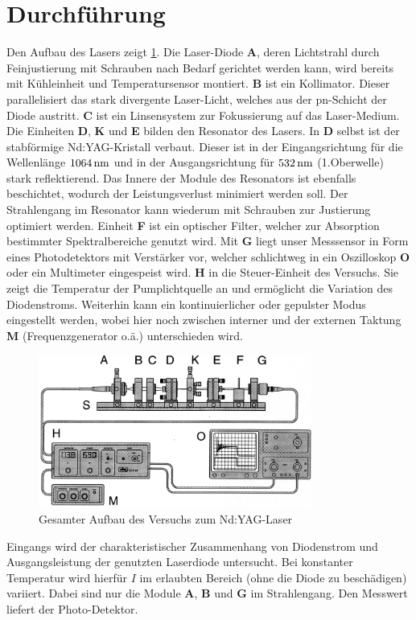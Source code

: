 \documentclass[numbers=noenddot,12pt,a4paper]{scrartcl}
\newcommand{\fett}[1]{\textbf{#1}}
\begin{document}
\section{Durchführung}\label{sec:durch}
Den Aufbau des Lasers zeigt \ref{img:aufbau}. Die Laser-Diode \fett{A}, deren Lichtstrahl durch Feinjustierung mit Schrauben nach Bedarf gerichtet werden kann, wird bereits mit Kühleinheit und Temperatursensor montiert. \fett{B} ist ein Kollimator. Dieser parallelisiert das stark divergente Laser-Licht, welches aus der pn-Schicht der Diode austritt. \fett{C} ist ein Linsensystem zur Fokussierung auf das Laser-Medium. Die Einheiten \fett{D}, \fett{K} und \fett{E} bilden den Resonator des Lasers. In \fett{D} selbst ist der stabförmige Nd:YAG-Kristall verbaut. Dieser ist in der Eingangsrichtung für die Wellenlänge $\unit[1064]{nm}$ und in der Ausgangsrichtung für $\unit[532]{nm}$ (1.Oberwelle) stark reflektierend. Das Innere der Module des Resonators ist ebenfalls beschichtet, wodurch der Leistungsverlust minimiert werden soll. Der Strahlengang im Resonator kann wiederum mit Schrauben zur Justierung optimiert werden. Einheit \fett{F} ist ein optischer Filter, welcher zur Absorption bestimmter Spektralbereiche genutzt wird. Mit \fett{G} liegt unser Messsensor in Form eines Photodetektors mit Verstärker vor, welcher schlichtweg in ein Oszilloskop \fett{O} oder ein Multimeter eingespeist wird. \fett{H} in die Steuer-Einheit des Versuchs. Sie zeigt die Temperatur der Pumplichtquelle an und ermöglicht die Variation des Diodenstroms. Weiterhin kann ein kontinuierlicher oder gepulster Modus eingestellt werden, wobei hier noch zwischen interner und der externen Taktung \fett{M} (Frequenzgenerator o.ä.) unterschieden wird.
\begin{figure}[H]
	\centering
	\includegraphics[width=0.8\textwidth]{aufbau1.png}
	\caption{Gesamter Aufbau des Versuchs zum Nd:YAG-Laser}\label{img:aufbau}
\end{figure}
Eingangs wird der charakteristischer Zusammenhang von Diodenstrom und Ausgangsleistung der genutzten Laserdiode untersucht. Bei konstanter Temperatur wird hierfür $I$ im erlaubten Bereich (ohne die Diode zu beschädigen) variiert. Dabei sind nur die Module \fett{A}, \fett{B} und \fett{G} im Strahlengang. Den Messwert liefert der Photo-Detektor.\\
\end{document}
